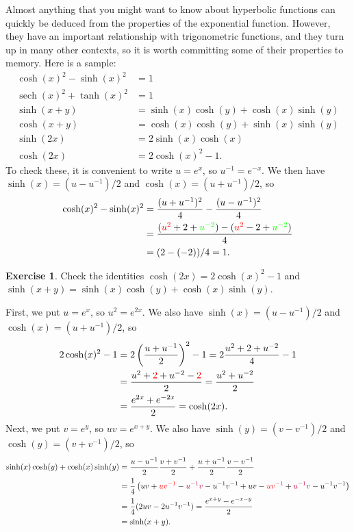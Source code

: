 \documentclass[a4paper]{book}
\newcommand{\RED}[1]{{\color{red}#1}}
\newcommand{\GREEN}[1]{{\color{green}#1}}
\newcommand{\PURPLE}[1]{{\color{purple}#1}}
\newcommand{\sech}     {\operatorname{sech}}
\renewcommand{\:}{\colon}
\theoremstyle{definition}
\newtheorem{exercise}[theorem]{Exercise}
\renewenvironment{solution}{\SolutionInline}{\endSolutionInline}
\begin{document}
Almost anything that you might want to know about hyperbolic functions
can quickly be deduced from the properties of the exponential
function.  However, they have an important relationship with
trigonometric functions, and they turn up in many other contexts, so
it is worth committing some of their properties to memory.  Here is a
sample:
\begin{align*}
 \cosh(x)^2 - \sinh(x)^2 &= 1 \\
 \sech(x)^2 + \tanh(x)^2 &= 1 \\
 \sinh(x+y) &= \sinh(x)\cosh(y) + \cosh(x)\sinh(y) \\
 \cosh(x+y) &= \cosh(x)\cosh(y) + \sinh(x)\sinh(y) \\
 \sinh(2x)  &= 2\sinh(x)\cosh(x) \\
 \cosh(2x)  &= 2\cosh(x)^2 - 1.
\end{align*}
To check these, it is convenient to write $u=e^x$, so
$u^{-1}=e^{-x}$.  We then have $\sinh(x)=(u-u^{-1})/2$ and
$\cosh(x)=(u+u^{-1})/2$, so
\begin{align*}
 \cosh(x)^2 - \sinh(x)^2 &=
  \frac{(u+u^{-1})^2}{4} - \frac{(u-u^{-1})^2}{4} \\
  &= \frac{(\RED{u^2}+2+\GREEN{u^{-2}}) -
           (\RED{u^2}-2+\GREEN{u^{-2}})}{4} \\
  &= (2-(-2))/4 = 1.
\end{align*}
\begin{exercise}
 Check the identities $\cosh(2x)=2\cosh(x)^2-1$ and
 $\sinh(x+y)=\sinh(x)\cosh(y)+\cosh(x)\sinh(y)$. 
\end{exercise}
\begin{solution}
 First, we put $u=e^x$, so $u^2=e^{2x}$.  We also have
 $\sinh(x)=(u-u^{-1})/2$ and $\cosh(x)=(u+u^{-1})/2$, so
 \begin{align*}
  2\cosh(x)^2-1 &= 2\left(\frac{u+u^{-1}}{2}\right)^2 - 1
    = 2\frac{u^2 + 2 + u^{-2}}{4} - 1 \\
   &= \frac{u^2 + \RED{2} + u^{-2} - \RED{2}}{2} 
    = \frac{u^2+u^{-2}}{2} \\
   &= \frac{e^{2x} + e^{-2x}}{2} = \cosh(2x).
 \end{align*}
 Next, we put $v=e^y$, so $uv=e^{x+y}$.  We also have
 $\sinh(y)=(v-v^{-1})/2$ and $\cosh(y)=(v+v^{-1})/2$, so
 \begin{align*}
  \sinh(x)\cosh(y)+\cosh(x)\sinh(y) &= 
   \frac{u-u^{-1}}{2} \frac{v+v^{-1}}{2} + 
   \frac{u+u^{-1}}{2} \frac{v-v^{-1}}{2} \\
  &= \frac{1}{4}\left(
      uv + \RED{uv^{-1}} - \PURPLE{u^{-1}v} - u^{-1}v^{-1} +
      uv - \RED{uv^{-1}} + \PURPLE{u^{-1}v} - u^{-1}v^{-1}
     \right) \\
  &= \frac{1}{4}(2uv - 2u^{-1}v^{-1}) = \frac{e^{x+y}-e^{-x-y}}{2} \\
  &= \sinh(x+y).
 \end{align*}
\end{solution}
\end{document}
